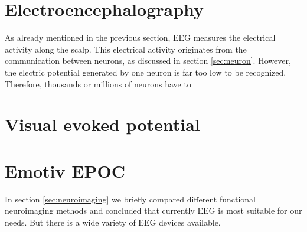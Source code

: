 \section{Electroencephalography}

As already mentioned in the previous section, \acrshort{EEG} measures the electrical activity along the scalp. This electrical activity originates from the communication between neurons, as discussed in section \ref{sec:neuron}. However, the electric potential generated by one neuron is far too low to be recognized. Therefore, thousands or millions of neurons have to 

\section{Visual evoked potential}

\section{Emotiv EPOC}
In section \ref{sec:neuroimaging} we briefly compared different functional neuroimaging methods and concluded that currently \acrshort{EEG} is most suitable for our needs. But there is a wide variety of EEG devices available. 
 